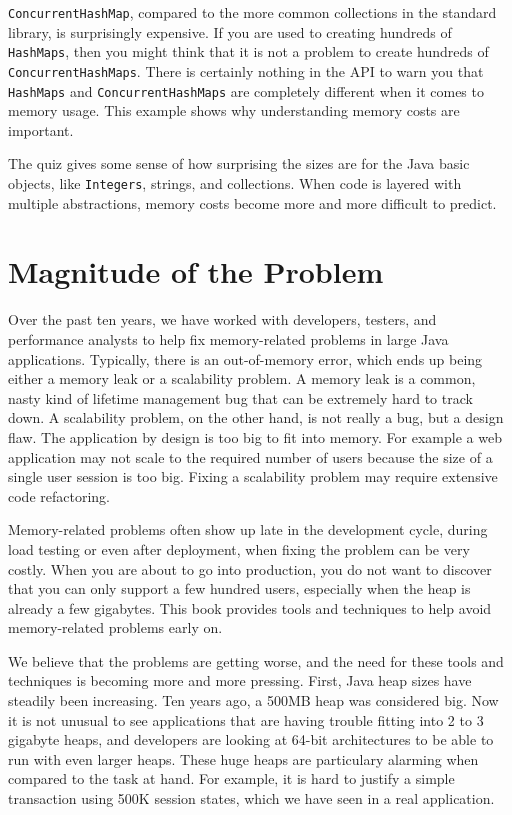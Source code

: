 \begin{itemize}
\texttt{ConcurrentHashMap}, compared to the more common collections in the standard library, is surprisingly expensive. If you are used to creating hundreds of \texttt{HashMaps}, then you might think that it is not a problem to create hundreds of \texttt{ConcurrentHashMaps}. There is certainly nothing in the API to warn you that \texttt{HashMaps} and \texttt{ConcurrentHashMaps} are completely different when it comes to memory usage. This example shows why understanding memory costs are important.

The quiz gives some sense of how surprising the sizes are for the Java basic objects, like \texttt{Integers}, strings, and collections. When code is layered with multiple abstractions, memory costs become more and more difficult to predict.


\section{Magnitude of the Problem}

Over the past ten years, we have worked with developers, testers, and performance analysts to help fix memory-related problems in large Java applications. Typically, there is an out-of-memory error, which ends up being either a memory leak or a scalability problem. A memory leak is a common, nasty kind of lifetime management bug that can be extremely hard to track down. A scalability problem, on the other hand, is not really a bug, but a design flaw. The application by design is too big to fit into memory. For example a web application may not scale to the required number of users because the size of a single user session is too big. Fixing a scalability problem may require extensive code refactoring.
  
Memory-related problems often show up late in the development cycle, during load testing or even after deployment, when fixing the problem can be very costly. When you are about to go into production, you do not want to discover that you can only support a few hundred users, especially when the heap is already a few gigabytes. This book provides tools and techniques to help avoid memory-related problems early on. 

We believe that the problems are getting worse, and the need for these tools and techniques is becoming more and more pressing. First, Java heap sizes have steadily been increasing.  Ten years ago, a 500MB heap was considered big. Now it is not unusual to see applications that are having trouble fitting into 2 to 3 gigabyte heaps, and developers are looking at 64-bit architectures to be able to run with even larger heaps.  These huge heaps are particulary alarming when compared to the task at hand. For example, it is hard to justify a simple transaction using 500K session states, which we have seen in a real application.       


\end{itemize}
